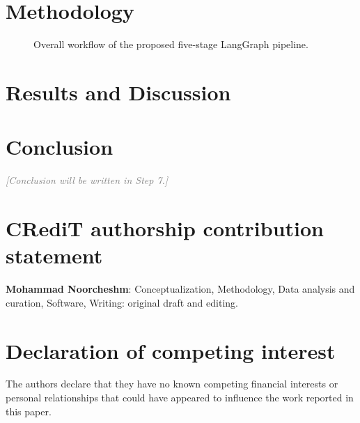 \documentclass[11pt,twocolumn]{article}
\begin{document}
\section{Methodology}\label{sec:methodology}


\begin{figure}[tp]
  \centering
  
  \caption{Overall workflow of the proposed five-stage LangGraph pipeline.}
  \label{fig:flowchart}
\end{figure}

\section{Results and Discussion}\label{sec:results}


\section{Conclusion}\label{sec:conclusion}
\textcolor{gray}{\textit{[Conclusion will be written in Step 7.]}}

\section*{CRediT authorship contribution statement}
\textbf{Mohammad Noorcheshm}: Conceptualization, Methodology, Data analysis
and curation, Software, Writing: original draft and editing.

\section*{Declaration of competing interest}
The authors declare that they have no known competing financial interests or
personal relationships that could have appeared to influence the work reported
in this paper.
\end{document}
